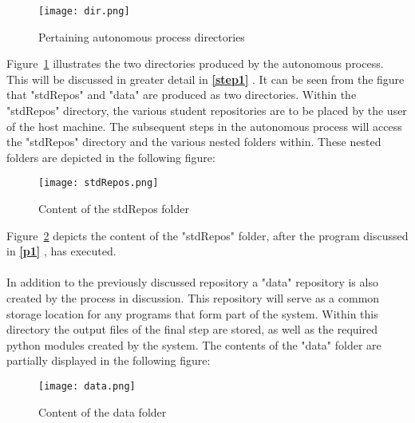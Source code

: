 \begin{figure}[H]
\begin{center}
\texttt{[image: dir.png]}
\caption{Pertaining autonomous process directories}
\label{dir}
\end{center}
\end{figure}

Figure~\ref{dir} illustrates the two directories produced by the autonomous process. This will be discussed in greater detail in \textbf{\ref{step1} }. It can be seen from the figure that "stdRepos" and "data" are produced as two directories. Within the "stdRepos" directory, the various student repositories are to be placed by the user of the host machine. The subsequent steps in the autonomous process will access the "stdRepos" directory and the various nested folders within. These nested folders are depicted in the following figure:

\begin{figure}[H]
\begin{center}
\texttt{[image: stdRepos.png]}
\caption{Content of the stdRepos folder}
\label{stdRepos12}
\end{center}
\end{figure}

Figure~\ref{stdRepos12} depicts the content of the "stdRepos" folder, after the program discussed in \textbf{\ref{p1} }, has executed.
\\\\
In addition to the previously discussed repository a "data" repository is also created by the process in discussion. This repository will serve as a common storage location for any programs that form part of the system. Within this directory the output files of the final step are stored, as well as the required python modules created by the system. The contents of the "data" folder are partially displayed in the following figure:

\begin{figure}[H]
\begin{center}
\texttt{[image: data.png]} 
\caption{Content of the data folder}
\label{data23}
\end{center}
\end{figure}

